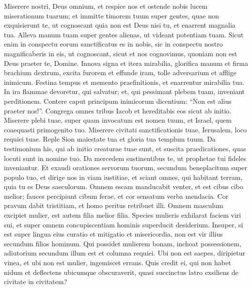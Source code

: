 \begin{biblechapter}  
\verse Miserere nostri, Deus omnium, et respice nos et ostende nobis lucem miserationum tuarum; 
\verse et immitte timorem tuum super gentes, quae non exquisierunt te, ut cognoscant quia non est Deus nisi tu, et enarrent magnalia tua. 
\verse Alleva manum tuam super gentes alienas, ut videant potentiam tuam. 
\verse Sicut enim in conspectu eorum sanctificatus es in nobis, sic in conspectu nostro magnificaberis in eis, 
\verse ut cognoscant, sicut et nos cognovimus, quoniam non est Deus praeter te, Domine. 
\verse Innova signa et itera mirabilia, 
\verse glorifica manum et firma brachium dextrum, 
\verse excita furorem et effunde iram, 
\verse tolle adversarium et afflige inimicum. 
\verse Festina tempus et memento praefinitionis, et enarrentur mirabilia tua. 
\verse In ira flammae devoretur, qui salvatur; et, qui pessimant plebem tuam, inveniant perditionem. 
\verse Contere caput principum inimicorum dicentium: “Non est alius praeter nos!”. 
\verse Congrega omnes tribus Iacob et hereditabis eos sicut ab initio. 
\verse Miserere plebi tuae, super quam invocatum est nomen tuum, et Israel, quem coaequasti primogenito tuo. 
\verse Miserere civitati sanctificationis tuae, Ierusalem, loco requiei tuae. 
\verse Reple Sion maiestate tua et gloria tua templum tuum. 
\verse Da testimonium his, qui ab initio creaturae tuae sunt, et suscita praedicationes, quas locuti sunt in nomine tuo. 
\verse Da mercedem sustinentibus te, ut prophetae tui fideles inveniantur. Et exaudi orationes servorum tuorum, 
\verse secundum beneplacitum super populo tuo, et dirige nos in viam iustitiae, et sciant omnes, qui habitant terram, quia tu es Deus saeculorum. 
\verse Omnem escam manducabit venter, et est cibus cibo melior; 
\verse fauces percipiunt cibum ferae, et cor sensatum verba mendacia. 
\verse Cor pravum dabit tristitiam, et homo peritus retribuet illi. 
\verse Omnem masculum excipiet mulier, est autem filia melior filia. 
\verse Species mulieris exhilarat faciem viri sui, et super omnem concupiscentiam hominis superducit desiderium. 
\verse Insuper, si est super lingua eius curatio et mitigatio et misericordia, non est vir illius secundum filios hominum. 
\verse Qui possidet mulierem bonam, inchoat possessionem, adiutorium secundum illum est et columna requiei. 
\verse Ubi non est saepes, diripietur vinea, et ubi non est mulier, ingemiscet errans. 
\verse Quis credit ei, qui non habet nidum et deflectens ubicumque obscuraverit, quasi succinctus latro exsiliens de civitate in civitatem? 
\end{biblechapter}

